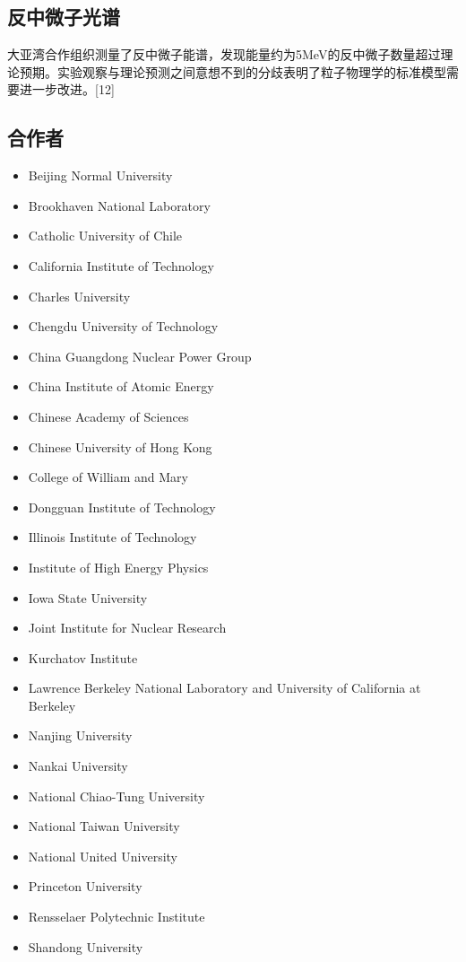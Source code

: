 \subsection{反中微子光谱}
大亚湾合作组织测量了反中微子能谱，发现能量约为5MeV的反中微子数量超过理论预期。实验观察与理论预测之间意想不到的分歧表明了粒子物理学的标准模型需要进一步改进。[12]

\subsection{合作者}
\begin{itemize}
\item Beijing Normal University
\item Brookhaven National Laboratory
\item Catholic University of Chile
\item California Institute of Technology
\item Charles University
\item Chengdu University of Technology
\item China Guangdong Nuclear Power Group
\item China Institute of Atomic Energy
\item Chinese Academy of Sciences
\item Chinese University of Hong Kong
\item College of William and Mary
\item Dongguan Institute of Technology
\item Illinois Institute of Technology
\item Institute of High Energy Physics
\item Iowa State University
\item Joint Institute for Nuclear Research
\item Kurchatov Institute
\item Lawrence Berkeley National Laboratory and University of California at Berkeley
\item Nanjing University
\item Nankai University
\item National Chiao-Tung University
\item National Taiwan University
\item National United University
\item Princeton University
\item Rensselaer Polytechnic Institute
\item Shandong University

\end{itemize}
